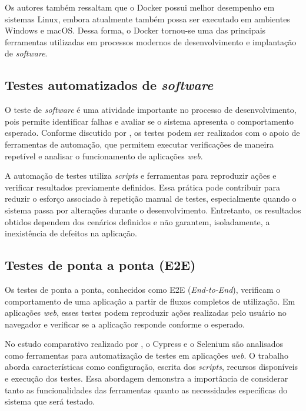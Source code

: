 Os autores também ressaltam que o Docker possui melhor desempenho em sistemas Linux, embora atualmente também possa ser executado em ambientes Windows e macOS. Dessa forma, o Docker tornou-se uma das principais ferramentas utilizadas em processos modernos de desenvolvimento e implantação de \textit{software}.

\subsection{Testes automatizados de \textit{software}}

O teste de \textit{software} é uma atividade importante no processo de desenvolvimento, pois permite identificar falhas e avaliar se o sistema apresenta o comportamento esperado. Conforme discutido por , os testes podem ser realizados com o apoio de ferramentas de automação, que permitem executar verificações de maneira repetível e analisar o funcionamento de aplicações \textit{web}.

A automação de testes utiliza \textit{scripts} e ferramentas para reproduzir ações e verificar resultados previamente definidos. Essa prática pode contribuir para reduzir o esforço associado à repetição manual de testes, especialmente quando o sistema passa por alterações durante o desenvolvimento. Entretanto, os resultados obtidos dependem dos cenários definidos e não garantem, isoladamente, a inexistência de defeitos na aplicação.

\subsection{Testes de ponta a ponta (E2E)}

Os testes de ponta a ponta, conhecidos como E2E (\textit{End-to-End}), verificam o comportamento de uma aplicação a partir de fluxos completos de utilização. Em aplicações \textit{web}, esses testes podem reproduzir ações realizadas pelo usuário no navegador e verificar se a aplicação responde conforme o esperado.

No estudo comparativo realizado por , o Cypress e o Selenium são analisados como ferramentas para automatização de testes em aplicações \textit{web}. O trabalho aborda características como configuração, escrita dos \textit{scripts}, recursos disponíveis e execução dos testes. Essa abordagem demonstra a importância de considerar tanto as funcionalidades das ferramentas quanto as necessidades específicas do sistema que será testado.

